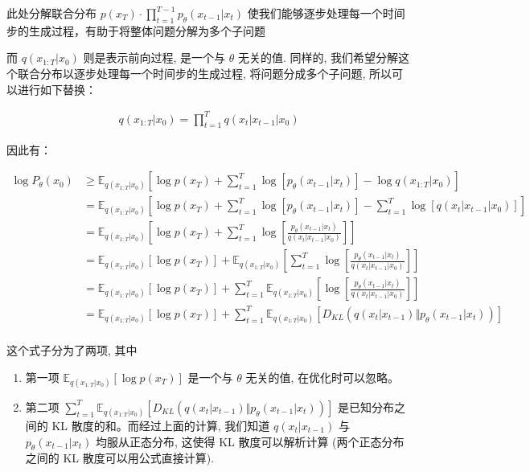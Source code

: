 此处分解联合分布 $p(x_T)\cdot\prod\limits_{t=1}^{T-1}p_\theta(x_{t-1}|x_t)$ 使我们能够逐步处理每一个时间步的生成过程，有助于将整体问题分解为多个子问题

而 $q(x_{1:T}|x_0)$ 则是表示前向过程, 是一个与 $\theta$ 无关的值. 同样的, 我们希望分解这个联合分布以逐步处理每一个时间步的生成过程, 将问题分成多个子问题, 所以可以进行如下替换：

\begin{equation}
\begin{aligned}
    q(x_{1:T}|x_0)=\prod_{t=1}^T q(x_t|x_{t-1}|x_0)
\end{aligned}
\end{equation}

因此有：


\begin{equation}
\begin{aligned}
	\log P_\theta(x_0) &\ge \mathbb{E}_{q(x_{1:T}|x_0)}\left[\log p(x_T)+\sum_{t=1}^{T}\log\left[p_\theta(x_{t-1}|x_t)\right]-\log q(x_{1:T}|x_0)\right]\\	
	&= \mathbb{E}_{q(x_{1:T}|x_0)}\left[\log p(x_T)+\sum_{t=1}^{T}\log\left[p_\theta(x_{t-1}|x_t)\right]-\sum_{t=1}^T\log\left[ q(x_t|x_{t-1}|x_0)\right] \right]\\
	&= \mathbb{E}_{q(x_{1:T}|x_0)}\left[\log p(x_T)+\sum_{t=1}^{T}\log\left[\frac{p_\theta(x_{t-1}|x_t)}{q(x_t|x_{t-1}|x_0)}\right] \right]\\
	&= \mathbb{E}_{q(x_{1:T}|x_0)}\left[\log p(x_T)\right]+\mathbb{E}_{q(x_{1:T}|x_0)}\left[\sum_{t=1}^{T}\log\left[\frac{p_\theta(x_{t-1}|x_t)}{q(x_t|x_{t-1}|x_0)}\right] \right]\\
	&= \mathbb{E}_{q(x_{1:T}|x_0)}\left[\log p(x_T)\right]+\sum_{t=1}^{T}\mathbb{E}_{q(x_{1:T}|x_0)}\left[\log\left[\frac{p_\theta(x_{t-1}|x_t)}{q(x_t|x_{t-1}|x_0)}\right] \right]\\
	&= \mathbb{E}_{q(x_{1:T}|x_0)}\left[\log p(x_T)\right]+\sum_{t=1}^{T}\mathbb{E}_{q(x_{1:T}|x_0)}\left[D_{KL}\left(q(x_t|x_{t-1})\Vert p_\theta(x_{t-1}|x_t)\right) \right]\\
\end{aligned}
\end{equation}


这个式子分为了两项, 其中

\begin{enumerate}
    \item 第一项 $\mathbb{E}_{q(x_{1:T}|x_0)}\left[\log p(x_T)\right]$ 是一个与 $\theta$ 无关的值, 在优化时可以忽略。
    \item 第二项 $\sum_{t=1}^{T}\mathbb{E}_{q(x_{1:T}|x_0)}\left[D_{KL}\left(q(x_t|x_{t-1})\Vert p_\theta(x_{t-1}|x_t)\right) \right]$ 是已知分布之间的 KL 散度的和。而经过上面的计算, 我们知道 $q(x_t|x_{t-1})$ 与 $p_\theta(x_{t-1}|x_t)$ 均服从正态分布, 这使得 KL 散度可以解析计算 (两个正态分布之间的 KL 散度可以用公式直接计算).
\end{enumerate}


